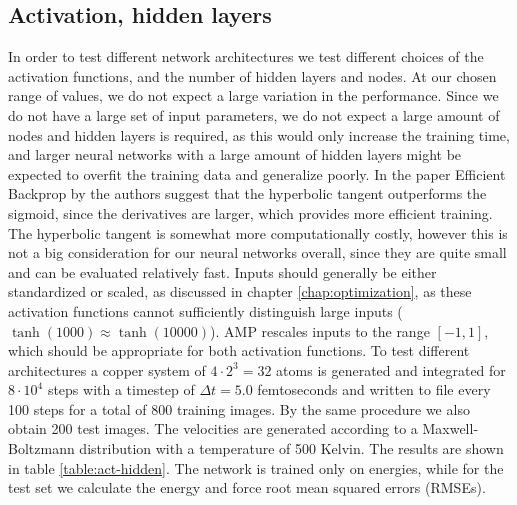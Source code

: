 \subsection{Activation, hidden layers}
In order to test different network architectures
we test different choices of the activation functions, and the number
of hidden layers and nodes.
At our chosen range of values, we do not expect a 
large variation in the performance.
Since we do not have a large set of input parameters, we do not expect
a large amount of nodes and hidden layers is required, as this would
only increase the training time,
and larger neural networks with a large amount of hidden layers
might be expected to overfit the training data and generalize poorly.
In the paper Efficient Backprop by \parencite[Lecun et al.]{
lecun2012efficient} the authors suggest that the hyperbolic
tangent outperforms the sigmoid, since the derivatives
are larger, which provides more efficient training.
The hyperbolic tangent is somewhat more computationally costly,
however this is not a big consideration for our neural networks
overall, since they are quite small and can be evaluated
relatively fast.
Inputs should generally be either standardized or scaled, 
as discussed in chapter \ref{chap:optimization},
as these activation functions cannot sufficiently distinguish
large inputs ($\tanh(1000) \approx \tanh(10000)$).
AMP rescales inputs to the range $\left[-1, 1\right]$,
which should be appropriate for both activation functions.
To test different architectures a copper system of $4 \cdot 2^3 = 32$
atoms is generated and integrated for $8 \cdot 10^4$ steps
with a timestep of $\Delta t = 5.0$ femtoseconds
and written to file every 100 steps for a total of 800 training images.
By the same procedure we also obtain 200 test images.
The velocities are generated
according to a Maxwell-Boltzmann distribution with a temperature
of 500 Kelvin. The results are shown in table \ref{table:act-hidden}.
The network is trained only on energies, while for the test set
we calculate the energy and force root mean squared errors (RMSEs).

